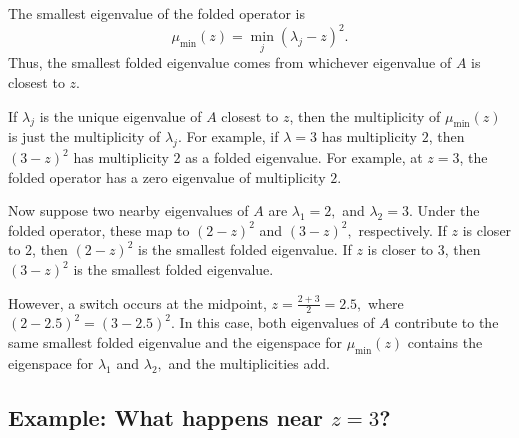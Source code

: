 \documentclass[12pt,a4paper]{article}
\begin{document}
The smallest eigenvalue of the folded operator is
\begin{equation}
    \mu_{\min}(z) = \min_j (\lambda_j-z)^2 .
\end{equation}
Thus, the smallest folded eigenvalue comes from whichever eigenvalue of $A$ is
closest to $z$.

If $\lambda_j$ is the unique eigenvalue of $A$ closest to $z$, then the
multiplicity of $\mu_{\min}(z)$ is just the multiplicity of $\lambda_j$.
For example, if $\lambda=3$ has multiplicity $2$, then $(3-z)^2$
has multiplicity $2$ as a folded eigenvalue. For example, at $z=3$, the
folded operator has a zero eigenvalue of multiplicity $2$.

Now suppose two nearby eigenvalues of $A$ are $\lambda_1=2,$ and $\lambda_2 = 3.$
Under the folded operator, these map to $(2-z)^2$ and $(3-z)^2,$ respectively.
If $z$ is closer to $2$, then $(2-z)^2$ is the smallest folded eigenvalue. If
$z$ is closer to $3$, then $(3-z)^2$ is the smallest folded eigenvalue.

However, a switch occurs at the midpoint, $z = \frac{2+3}{2} = 2.5,$ where
$(2-2.5)^2 = (3-2.5)^2.$
In this case, both eigenvalues of $A$ contribute to the same smallest folded eigenvalue and the eigenspace for $\mu_{\min}(z)$ contains the eigenspace for $\lambda_1$ and $\lambda_2,$ and the multiplicities add.


\subsection{Example: What happens near $z=3$?}
\end{document}

